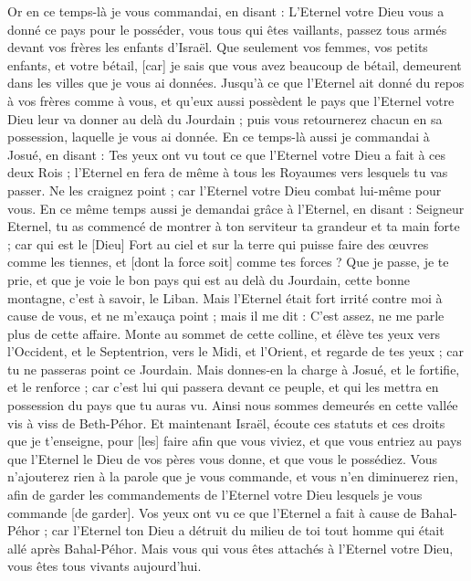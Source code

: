 \begin{multicols}{2}
Or en ce temps-là je vous commandai, en disant : L'Eternel votre Dieu vous a donné ce pays pour le posséder, vous tous qui êtes vaillants, passez tous armés devant vos frères les enfants d'Israël.
Que seulement vos femmes, vos petits enfants, et votre bétail, [car] je sais que vous avez beaucoup de bétail, demeurent dans les villes que je vous ai données.
Jusqu'à ce que l'Eternel ait donné du repos à vos frères comme à vous, et qu'eux aussi possèdent le pays que l'Eternel votre Dieu leur va donner au delà du Jourdain ; puis vous retournerez chacun en sa possession, laquelle je vous ai donnée.
En ce temps-là aussi je commandai à Josué, en disant : Tes yeux ont vu tout ce que l'Eternel votre Dieu a fait à ces deux Rois ; l'Eternel en fera de même à tous les Royaumes vers lesquels tu vas passer.
Ne les craignez point ; car l'Eternel votre Dieu combat lui-même pour vous.
En ce même temps aussi je demandai grâce à l'Eternel, en disant :
Seigneur Eternel, tu as commencé de montrer à ton serviteur ta grandeur et ta main forte ; car qui est le [Dieu] Fort au ciel et sur la terre qui puisse faire des œuvres comme les tiennes, et [dont la force soit] comme tes forces ?
Que je passe, je te prie, et que je voie le bon pays qui est au delà du Jourdain, cette bonne montagne, c'est à savoir, le Liban.
Mais l'Eternel était fort irrité contre moi à cause de vous, et ne m'exauça point ; mais il me dit : C'est assez, ne me parle plus de cette affaire.
Monte au sommet de cette colline, et élève tes yeux vers l'Occident, et le Septentrion, vers le Midi, et l'Orient, et regarde de tes yeux ; car tu ne passeras point ce Jourdain.
Mais donnes-en la charge à Josué, et le fortifie, et le renforce ; car c'est lui qui passera devant ce peuple, et qui les mettra en possession du pays que tu auras vu.
Ainsi nous sommes demeurés en cette vallée vis à viss de Beth-Péhor.
\VerseOne{}Et maintenant Israël, écoute ces statuts et ces droits que je t'enseigne, pour [les] faire afin que vous viviez, et que vous entriez au pays que l'Eternel le Dieu de vos pères vous donne, et que vous le possédiez.
Vous n'ajouterez rien à la parole que je vous commande, et vous n'en diminuerez rien, afin de garder les commandements de l'Eternel votre Dieu lesquels je vous commande [de garder].
Vos yeux ont vu ce que l'Eternel a fait à cause de Bahal-Péhor ; car l'Eternel ton Dieu a détruit du milieu de toi tout homme qui était allé après Bahal-Péhor.
Mais vous qui vous êtes attachés à l'Eternel votre Dieu, vous êtes tous vivants aujourd'hui.

\end{multicols}
